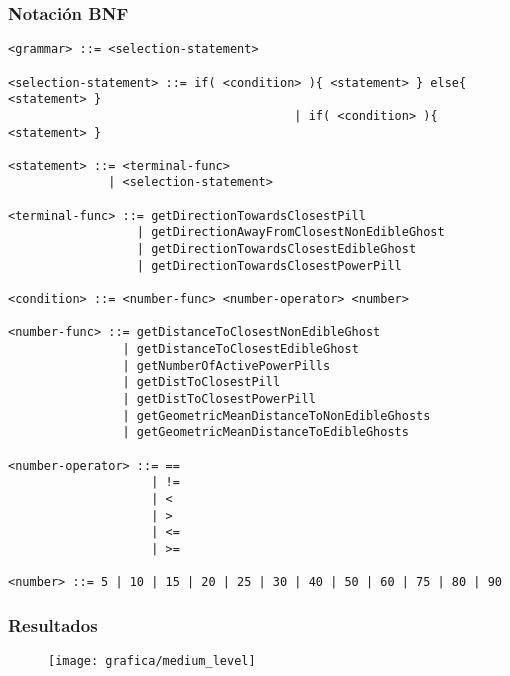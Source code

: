 \subsubsection{Notación BNF}
\begin{lstlisting}[frame=single, breaklines=no, basicstyle=\fontsize{10}{11}\ttfamily, caption=Gramática de medio nivel]
<grammar> ::= <selection-statement>

<selection-statement> ::= if( <condition> ){ <statement> } else{ <statement> }
                                        | if( <condition> ){ <statement> }

<statement> ::= <terminal-func>
              | <selection-statement>

<terminal-func> ::= getDirectionTowardsClosestPill
                  | getDirectionAwayFromClosestNonEdibleGhost
                  | getDirectionTowardsClosestEdibleGhost
                  | getDirectionTowardsClosestPowerPill
                  
<condition> ::= <number-func> <number-operator> <number>

<number-func> ::= getDistanceToClosestNonEdibleGhost
                | getDistanceToClosestEdibleGhost
                | getNumberOfActivePowerPills
                | getDistToClosestPill
                | getDistToClosestPowerPill
                | getGeometricMeanDistanceToNonEdibleGhosts
                | getGeometricMeanDistanceToEdibleGhosts

<number-operator> ::= ==
                    | !=
                    | <
                    | >
                    | <=
                    | >=

<number> ::= 5 | 10 | 15 | 20 | 25 | 30 | 40 | 50 | 60 | 75 | 80 | 90
\end{lstlisting}

\subsubsection{Resultados}
\begin{figure}[H]
\centering
\texttt{[image: grafica/medium\_level]}
\end{figure}

